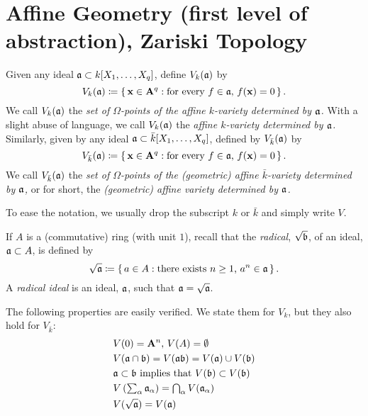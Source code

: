 \section{Affine Geometry (first level of abstraction), Zariski Topology}
\begin{definition}
Given any ideal $\mathfrak{a}\subset k[X_1,\dotsc,X_q]$, define $V_k(\mathfrak{a})$
by
\[
V_k(\mathfrak{a})\coloneqq\left\{\,\mathbf{x}\in\mathbf{A}^q:\text{for every
$f\in\mathfrak{a}$, $f(\mathbf{x})=0$}\,\right\}.
\]
We call $V_k(\mathfrak{a})$ the \emph{set of $\Omega$-points of the affine
  $k$-variety determined by $\mathfrak{a}$.} With a slight abuse of language, we
call $V_k(\mathfrak{a})$ the \emph{affine $k$-variety determined by $\mathfrak{a}$.}
Similarly, given by any ideal $\mathfrak{a}\subset\bar k[X_1,\dotsc,X_q]$,
defined by $V_{\bar k}(\mathfrak{a})$ by
\[
V_{\bar k}(\mathfrak{a})\coloneqq\left\{\,\mathbf{x}\in \mathbf{A}^q:
\text{for every $f\in\mathfrak{a}$, $f(\mathbf{x})=0$}\,\right\}.
\]
We call $V_{\bar k}(\mathfrak{a})$ the \emph{set of $\Omega$-points of the
  (geometric) affine $\bar k$-variety determined by $\mathfrak{a}$,} or for
short, the \emph{(geometric) affine variety determined by $\mathfrak{a}$.}
\end{definition}

To ease the notation, we usually drop the subscript $k$ or $\bar k$ and
simply write $V$.

If $A$ is a (commutative) ring (with unit $1$), recall that the
\emph{radical}, $\sqrt{\mathfrak{b}}$, of an ideal, $\mathfrak{a}\subset A$, is defined
by
\[
\sqrt{\mathfrak{a}}\coloneqq\left\{\,a\in A:\text{there exists $n\geq 1$,
    $a^n\in\mathfrak{a}$}\,\right\}.
\]
A \emph{radical ideal} is an ideal, $\mathfrak{a}$, such that
$\mathfrak{a}=\sqrt{\mathfrak{a}}$.

The following properties are easily verified. We state them for $V_k$, but
they also hold for $V_{\bar k}$:
\begin{align*}
&V(0)=\text{$\mathbf{A}^n$, $V(A)=\emptyset$}\\
&V(\mathfrak{a}\cap\mathfrak{b})=V(\mathfrak{a}\mathfrak{b})=V(\mathfrak{a})\cup V(\mathfrak{b})\\
&\mathfrak{a}\subset\text{$\mathfrak{b}$ implies that $V(\mathfrak{b})\subset V(\mathfrak{b})$}\\
&V\left({\textstyle\sum_\alpha\mathfrak{a}_\alpha}\right)
={\textstyle \bigcap_\alpha V(\mathfrak{a}_\alpha)}\\
&V(\sqrt{\mathfrak{a}})=V(\mathfrak{a})
\end{align*}


